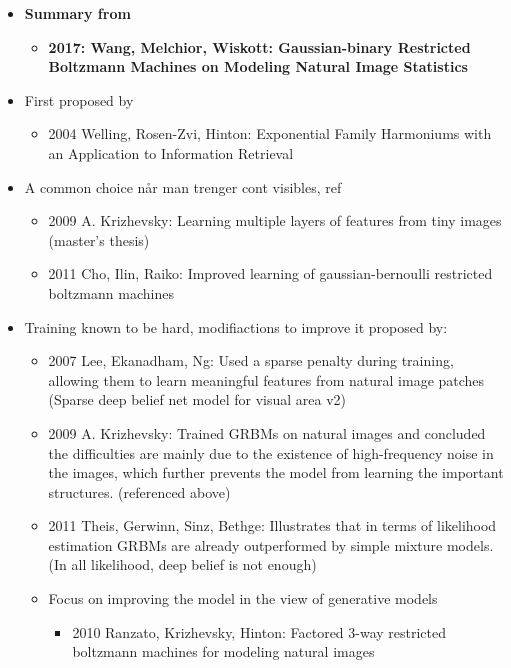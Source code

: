 \documentclass[twoside,english]{uiofysmaster}
\begin{document}
\begin{itemize}
	\item \textbf{Summary from}
	\begin{itemize}
		\item \textbf{2017: Wang, Melchior, Wiskott: Gaussian-binary Restricted Boltzmann Machines on Modeling Natural Image Statistics} \cite{Melchior2017}
\end{itemize}
	\item First proposed by
	\begin{itemize}
		\item 2004 Welling, Rosen-Zvi, Hinton: Exponential Family Harmoniums with an Application to Information Retrieval \cite{Welling2005}
	\end{itemize}
	\item A common choice når man trenger cont visibles, ref
	\begin{itemize}
		\item 2009 A. Krizhevsky: Learning multiple layers of features from tiny images (master's thesis) \cite{Krizhevsky2009}
		\item 2011 Cho, Ilin, Raiko: Improved learning of gaussian-bernoulli restricted boltzmann machines \cite{Cho2011}
	\end{itemize}
	\item Training known to be hard, modifiactions to improve it proposed by:
	\begin{itemize}
		\item 2007 Lee, Ekanadham, Ng: Used a sparse penalty during training, allowing them to learn meaningful features from natural image patches (Sparse deep belief net model for visual area v2) \cite{Lee2008}
		\item 2009 A. Krizhevsky: Trained GRBMs on natural images and concluded the difficulties are mainly due to the existence of high-frequency noise in the images, which further prevents the model from learning the important structures. (referenced above) \cite{Krizhevsky2009}
		\item 2011 Theis, Gerwinn, Sinz, Bethge: Illustrates that in terms of likelihood estimation GRBMs are already outperformed by simple mixture models. (In all likelihood, deep belief is not enough) \cite{Theis2011}
		\item Focus on improving the model in the view of generative models
		\begin{itemize}
			\item 2010 Ranzato, Krizhevsky, Hinton: Factored 3-way restricted boltzmann machines for modeling natural images \cite{Ranzato2010}

\end{itemize}
\end{itemize}
\end{itemize}
\end{document}
